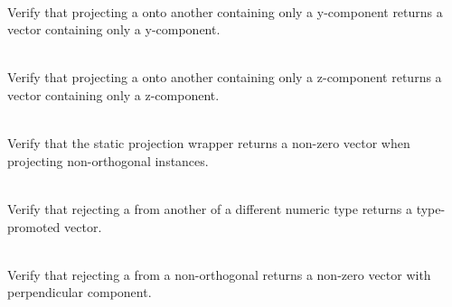 \begin{DoxyRefList}
\item[{\parbox[t]{\linewidth}{Member \doxylink{_projection_tests_8cpp_a8a2a41830269b98d66ffa9a48171809e}{Vector4\+DProjection\+\_\+\+Projection\+Onto\+YAxis\+Returns\+Vector\+With\+Only\+YComponent} ()}}]\hfill \\
\label{test__test000127}%
%
Verify that projecting a  onto another  containing only a y-\/component returns a vector containing only a y-\/component.  
\item[{\parbox[t]{\linewidth}{Member \doxylink{_projection_tests_8cpp_a62a50693d79508d4425d90c936181485}{Vector4\+DProjection\+\_\+\+Projection\+Onto\+ZAxis\+Returns\+Vector\+With\+Only\+ZComponent} ()}}]\hfill \\
\label{test__test000128}%
%
Verify that projecting a  onto another  containing only a z-\/component returns a vector containing only a z-\/component.  
\item[{\parbox[t]{\linewidth}{Member \doxylink{_projection_tests_8cpp_a33f55fa752f078c95542527e32a16d04}{Vector4\+DProjection\+\_\+\+Static\+Wrapper\+\_\+\+Non\+Orthogonal\+Projection\+Returns\+Non\+Zero\+Vector} ()}}]\hfill \\
\label{test__test000131}%
%
Verify that the  static projection wrapper returns a non-\/zero vector when projecting non-\/orthogonal instances.  
\item[{\parbox[t]{\linewidth}{Member \doxylink{_projection_tests_8cpp_a92f907361e059da4f4f1ed52f8e4838d}{Vector4\+DRejection\+\_\+\+Mixed\+Type\+Rejection\+Promotes\+Type} ()}}]\hfill \\
\label{test__test000145}%
%
Verify that rejecting a  from another  of a different numeric type returns a type-\/promoted vector.  
\item[{\parbox[t]{\linewidth}{Member \doxylink{_projection_tests_8cpp_adc89a1a646ead7fb6e20b47b22af43f9}{Vector4\+DRejection\+\_\+\+Non\+Orthogonal\+Rejection\+Returns\+Non\+Zero\+Vector} ()}}]\hfill \\
\label{test__test000141}%
%
Verify that rejecting a  from a non-\/orthogonal  returns a non-\/zero vector with perpendicular component.  

\end{DoxyRefList}
